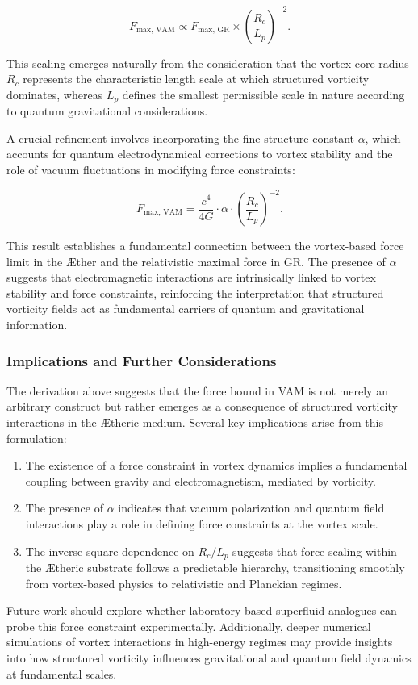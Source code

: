 \begin{equation*}
F_{\text{max, VAM}} \propto F_{\text{max, GR}} \times \left(\frac{R_c}{L_p}\right)^{-2}.
\end{equation*}


This scaling emerges naturally from the consideration that the vortex-core radius $R_c$ represents the characteristic length scale at which structured vorticity dominates, whereas $L_p$ defines the smallest permissible scale in nature according to quantum gravitational considerations.


A crucial refinement involves incorporating the fine-structure constant $\alpha$, which accounts for quantum electrodynamical corrections to vortex stability and the role of vacuum fluctuations in modifying force constraints:


\begin{equation*}
F_{\text{max, VAM}} = \frac{c^4}{4G} \cdot \alpha \cdot \left(\frac{R_c}{L_p}\right)^{-2}.
\end{equation*}


This result establishes a fundamental connection between the vortex-based force limit in the \AE ther and the relativistic maximal force in GR. The presence of $\alpha$ suggests that electromagnetic interactions are intrinsically linked to vortex stability and force constraints, reinforcing the interpretation that structured vorticity fields act as fundamental carriers of quantum and gravitational information.


\subsubsection*{Implications and Further Considerations}
The derivation above suggests that the force bound in VAM is not merely an arbitrary construct but rather emerges as a consequence of structured vorticity interactions in the \AE theric medium. Several key implications arise from this formulation:
\begin{enumerate}
\item The existence of a force constraint in vortex dynamics implies a fundamental coupling between gravity and electromagnetism, mediated by vorticity.
\item The presence of $\alpha$ indicates that vacuum polarization and quantum field interactions play a role in defining force constraints at the vortex scale.
\item The inverse-square dependence on $R_c/L_p$ suggests that force scaling within the \AE theric substrate follows a predictable hierarchy, transitioning smoothly from vortex-based physics to relativistic and Planckian regimes.
\end{enumerate}


Future work should explore whether laboratory-based superfluid analogues can probe this force constraint experimentally. Additionally, deeper numerical simulations of vortex interactions in high-energy regimes may provide insights into how structured vorticity influences gravitational and quantum field dynamics at fundamental scales.




